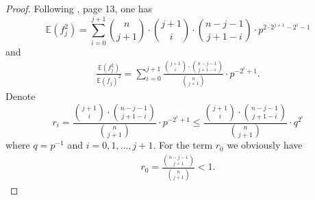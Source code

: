 \documentclass[11pt,twoside, reqno]{amsart}
\theoremstyle{plain}
\theoremstyle{definition}
\begin{document}
\begin{proof} 
%
 
Following \cite{FM}, page 13, one has
$$
\mathbb E(f^2_j)= \sum_{i=0}^{j+1}\binom n {j+1}\cdot \binom {j+1}{i} \cdot \binom {n-j-1}{j+1-i}\cdot p^{2\cdot 2^{j+1}-2^i-1}
$$
and 
\begin{eqnarray*}\label{eq:30}
\frac{\mathbb E(f^2_j)}{\mathbb E(f_j)^2}= \sum_{i=0}^{j+1}\frac{\binom {j+1}{i} \cdot \binom {n-j-1}{j+1-i}}{\binom n {j+1}}\cdot p^{-2^i+1}.
\end{eqnarray*}
Denote 
$$
r_i= \frac{\binom {j+1}{i} \cdot \binom {n-j-1}{j+1-i}}{\binom n {j+1}}\cdot p^{-2^i+1}\le \frac{\binom {j+1}{i} \cdot \binom {n-j-1}{j+1-i}}{\binom n {j+1}}\cdot q^{2^i}
$$
where $q=p^{-1}$ and $ i=0, 1, \dots, j+1.$
For the term $r_0$ we obviously have
\begin{eqnarray*}\label{eq:r0}
r_0= \frac{\binom {n-j-1}{j+1}}{{\binom{n} {j+1}}}<1.
\end{eqnarray*}


\end{proof}
\end{document}
